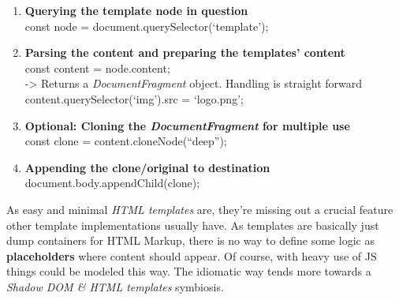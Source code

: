 \documentclass[]{assets/latex/ieee}
\providecommand{\tightlist}{%
  \setlength{\itemsep}{0pt}\setlength{\parskip}{0pt}}
\begin{document}
\begin{enumerate}
\def\labelenumi{\arabic{enumi}.}
\tightlist
\item
  \textbf{Querying the template node in question}\\
  const node = document.querySelector(`template');
\item
  \textbf{Parsing the content and preparing the templates' content}\\
  const content = node.content;\\
  -\textgreater{} Returns a \emph{DocumentFragment} object. Handling is
  straight forward\\
  content.querySelector(`img').src = `logo.png';
\item
  \textbf{Optional: Cloning the \emph{DocumentFragment} for multiple
  use}\\
  const clone = content.cloneNode(``deep'');
\item
  \textbf{Appending the clone/original to destination}\\
  document.body.appendChild(clone);
\end{enumerate}

As easy and minimal \emph{HTML templates} are, they're missing out a
crucial feature other template implementations usually have. As
templates are basically just dump containers for HTML Markup, there is
no way to define some logic as \textbf{placeholders} where content
should appear. Of course, with heavy use of JS things could be modeled
this way. The idiomatic way tends more towards a \emph{Shadow DOM \&
HTML templates} symbiosis.
\end{document}
